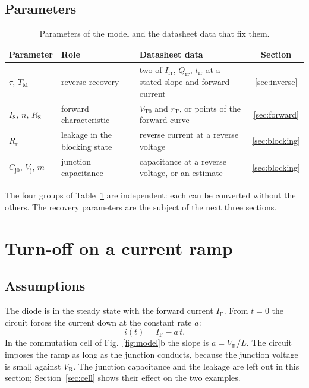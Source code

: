 \documentclass[10pt,a4paper]{scrartcl}
\newcommand{\IF}{I_\mathrm{F}}
\newcommand{\VR}{V_\mathrm{R}}
\newcommand{\Irr}{I_\mathrm{rr}}
\newcommand{\Qrr}{Q_\mathrm{rr}}
\newcommand{\trr}{t_\mathrm{rr}}
\newcommand{\TM}{T_\mathrm{M}}
\newcommand{\IS}{I_\mathrm{S}}
\newcommand{\RS}{R_\mathrm{S}}
\newcommand{\Rr}{R_\mathrm{r}}
\newcommand{\VTo}{V_\mathrm{T0}}
\newcommand{\rT}{r_\mathrm{T}}
\newcommand{\Cjo}{C_\mathrm{j0}}
\begin{document}
\subsection{Parameters}
\begin{table}[htb]
\centering\small
\caption{Parameters of the model and the datasheet data that fix them.}
\label{tab:params}
\begin{tabular}{@{}llp{6.4cm}c@{}}
\toprule
Parameter & Role & Datasheet data & Section \\
\midrule
$\tau$, $\TM$ & reverse recovery & two of $\Irr$, $\Qrr$, $\trr$ at a stated slope and forward current & \ref{sec:inverse} \\
$\IS$, $n$, $\RS$ & forward characteristic & $\VTo$ and $\rT$, or points of the forward curve & \ref{sec:forward} \\
$\Rr$ & leakage in the blocking state & reverse current at a reverse voltage & \ref{sec:blocking} \\
$\Cjo$, $V_\mathrm{j}$, $m$ & junction capacitance & capacitance at a reverse voltage, or an estimate & \ref{sec:blocking} \\
\bottomrule
\end{tabular}
\end{table}
The four groups of Table~\ref{tab:params} are independent: each can be converted without the others. The recovery parameters are the subject of the next three sections.

\section{Turn-off on a current ramp}
\label{sec:ramp}
\subsection{Assumptions}
The diode is in the steady state with the forward current $\IF$. From $t = 0$ the circuit forces the current down at the constant rate $a$:
\begin{equation}
i(t) = \IF - a\,t .
\label{eq:ramp}
\end{equation}
In the commutation cell of Fig.~\ref{fig:model}b the slope is $a = \VR/L$. The circuit imposes the ramp as long as the junction conducts, because the junction voltage is small against $\VR$. The junction capacitance and the leakage are left out in this section; Section~\ref{sec:cell} shows their effect on the two examples.
\end{document}
